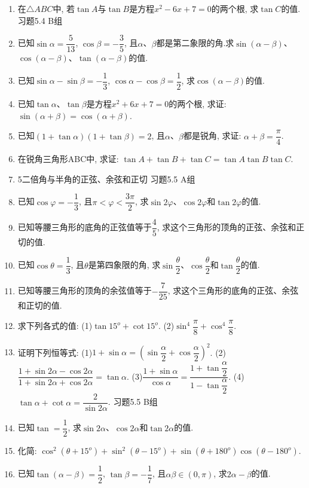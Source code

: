 \documentclass[10pt,a4paper]{article}
\begin{document}
\begin{enumerate}[1.]
\item 在$\triangle ABC$中, 若$\tan A$与$\tan B$是方程$x^2-6x+7=0$的两个根, 求$\tan C$的值.
习题5.4  B组
\item 已知$\sin \alpha =\dfrac 5{13}$, $\cos \beta =-\dfrac 35$, 且$\alpha$、$\beta$都是第二象限的角.求$\sin (\alpha -\beta)$、$\cos (\alpha -\beta)$、$\tan (\alpha -\beta)$的值.
\item 已知$\sin \alpha -\sin \beta =-\dfrac 13$, $\cos \alpha -\cos \beta =\dfrac 12$, 求$\cos (\alpha -\beta)$的值.
\item 已知$\tan \alpha$、$\tan \beta$是方程$x^2+6x+7=0$的两个根, 求证: $\sin (\alpha +\beta)=\cos (\alpha +\beta)$.
\item 已知$(1+\tan \alpha)(1+\tan \beta)=2$, 且$\alpha$、$\beta$都是锐角, 求证: $\alpha +\beta =\dfrac{\pi }4$.
\item 在锐角三角形ABC中, 求证: $\tan A+\tan B+\tan C=\tan A\tan B\tan C$.
\item 5二倍角与半角的正弦、余弦和正切
习题5.5  A组
\item 已知$\cos \varphi =-\dfrac 13$, 且$\pi <\varphi <\dfrac{3\pi }2$, 求$\sin 2\varphi$、$\cos 2\varphi$和$\tan 2\varphi$的值.
\item 已知等腰三角形的底角的正弦值等于$\dfrac 45$, 求这个三角形的顶角的正弦、余弦和正切的值.
\item 已知$\cos \theta =\dfrac 13$, 且$\theta$是第四象限的角, 求$\sin \dfrac{\theta }2$、$\cos \dfrac{\theta }2$和$\tan \dfrac{\theta }2$的值.
\item 已知等腰三角形的顶角的余弦值等于$-\dfrac 7{25}$, 求这个三角形的底角的正弦、余弦和正切的值.
\item 求下列各式的值:
(1)$\tan 15^o+\cot 15^o$.					(2)$\sin ^4\dfrac{\pi }8+\cos ^4\dfrac{\pi }8$.
\item 证明下列恒等式:
(1)$1+\sin \alpha =(\sin \dfrac{\alpha }2+\cos \dfrac{\alpha }2)^2$.
(2)$\dfrac{1+\sin 2\alpha -\cos 2\alpha }{1+\sin 2\alpha +\cos 2\alpha }=\tan \alpha$.
(3)$\dfrac{1+\sin \alpha }{\cos \alpha }=\dfrac{1+\tan \dfrac{\alpha }2}{1-\tan \dfrac{\alpha }2}$.
(4)$\tan \alpha +\cot \alpha =\dfrac 2{\sin 2\alpha }$.
习题5.5  B组
\item 已知$\tan =\dfrac 12$, 求$\sin 2\alpha$、$\cos 2\alpha$和$\tan 2\alpha$的值.
\item 化简: $\cos ^2(\theta +15^o)+\sin ^2(\theta -15^o)+\sin (\theta +180^o)\cos (\theta -180^o)$.
\item 已知$\tan (\alpha -\beta)=\dfrac 12$, $\tan \beta =-\dfrac 17$, 且$\alpha \beta \in (0,\pi)$, 求$2\alpha -\beta$的值.

\end{enumerate}
\end{document}
